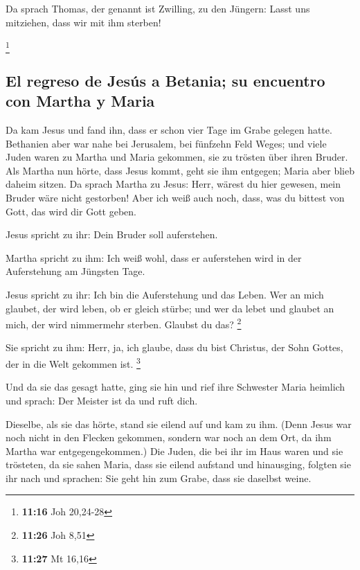  Da sprach Thomas, der genannt ist Zwilling, zu den
Jüngern: Lasst uns mitziehen, dass wir mit ihm sterben!

\footnote{\textbf{11:16} Joh 20,24-28}

\hypertarget{el-regreso-de-jesuxfas-a-betania-su-encuentro-con-martha-y-maria}{%
\subsection{El regreso de Jesús a Betania; su encuentro con Martha y
Maria}\label{el-regreso-de-jesuxfas-a-betania-su-encuentro-con-martha-y-maria}}

 Da kam Jesus und fand ihn, dass er schon vier Tage im
Grabe gelegen hatte.  Bethanien aber war nahe bei
Jerusalem, bei fünfzehn Feld Weges;  und viele Juden
waren zu Martha und Maria gekommen, sie zu trösten über ihren Bruder.
 Als Martha nun hörte, dass Jesus kommt, geht sie ihm
entgegen; Maria aber blieb daheim sitzen.  Da sprach
Martha zu Jesus: Herr, wärest du hier gewesen, mein Bruder wäre nicht
gestorben!  Aber ich weiß auch noch, dass, was du bittest
von Gott, das wird dir Gott geben.

 Jesus spricht zu ihr: Dein Bruder soll auferstehen.

 Martha spricht zu ihm: Ich weiß wohl, dass er
auferstehen wird in der Auferstehung am Jüngsten Tage.

 Jesus spricht zu ihr: Ich bin die Auferstehung und das
Leben. Wer an mich glaubet, der wird leben, ob er gleich stürbe;
 und wer da lebet und glaubet an mich, der wird
nimmermehr sterben. Glaubst du das? \footnote{\textbf{11:26} Joh 8,51}

 Sie spricht zu ihm: Herr, ja, ich glaube, dass du bist
Christus, der Sohn Gottes, der in die Welt gekommen ist. \footnote{\textbf{11:27}
  Mt 16,16}

 Und da sie das gesagt hatte, ging sie hin und rief ihre
Schwester Maria heimlich und sprach: Der Meister ist da und ruft dich.

 Dieselbe, als sie das hörte, stand sie eilend auf und
kam zu ihm.  (Denn Jesus war noch nicht in den Flecken
gekommen, sondern war noch an dem Ort, da ihm Martha war
entgegengekommen.)  Die Juden, die bei ihr im Haus waren
und sie trösteten, da sie sahen Maria, dass sie eilend aufstand und
hinausging, folgten sie ihr nach und sprachen: Sie geht hin zum Grabe,
dass sie daselbst weine.

